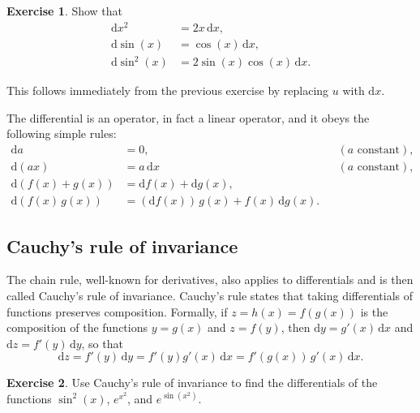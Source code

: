 \documentclass[12pt,a4paper]{article}
\makeatletter
\theoremstyle{definition}
\newtheorem{exercise}{Exercise}
\renewenvironment{proof}[1][\proofname]{\par
  \pushQED{\qed}%
  \normalfont \topsep6\p@\@plus6\p@\relax
  \trivlist
  \item[\hskip\labelsep\bfseries #1\@addpunct{.}]\ignorespaces
}{%
  \popQED\endtrivlist\@endpefalse
}
\newenvironment{solution}{%
  \begin{proof}[Solution]%
}{%
  \end{proof}%
}
\newcommand{\dd}{\mathrm{d}}
\makeatother
\begin{document}
\begin{exercise}\label{exer:7}
Show that
\begin{align*}
\dd x^2 &= 2x\, \dd x, \\
\dd\sin(x) &= \cos(x)\, \dd x, \\
\dd\sin^2(x) &= 2\sin(x)\cos(x)\, \dd x.
\end{align*}
\end{exercise}

\begin{solution}
This follows immediately from the previous exercise by replacing $u$ with $\dd x$. %
\end{solution}

The differential is an operator, in fact a linear operator, and it obeys the following simple rules:
\begin{equation}\label{eq:12}
\begin{aligned}
\dd a &= 0, & & (a \text{ constant}), \\
\dd(ax) &= a\, \dd x & & (a \text{ constant}), \\
\dd(f(x) + g(x)) &= \dd f(x) + \dd g(x), \\
\dd(f(x)\, g(x)) &= (\dd f(x))\, g(x) + f(x)\, \dd g(x).
\end{aligned}
\end{equation}

\subsection{Cauchy's rule of invariance}\label{sec:4.2}

The chain rule, well-known for derivatives, also applies to differentials and is then called Cauchy's rule of invariance. Cauchy's rule states that taking differentials of functions preserves composition. Formally, if $z = h(x) = f(g(x))$ is the composition of the functions $y = g(x)$ and $z = f(y)$, then $\dd y = g'(x)\, \dd x$ and $\dd z = f'(y)\, \dd y$, so that
\begin{equation}\label{eq:13}
\dd z = f'(y)\, \dd y = f'(y) g'(x)\, \dd x = f'(g(x))\, g'(x)\, \dd x.
\end{equation}

\begin{exercise}\label{exer:8}
Use Cauchy's rule of invariance to find the differentials of the functions $\sin^2(x)$, $e^{x^2}$, and $e^{\sin(x^2)}$.
\end{exercise}
\end{document}

